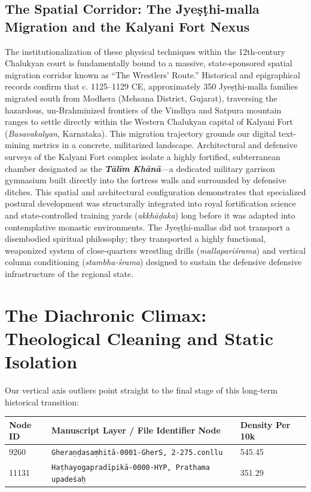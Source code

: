 \documentclass[11pt,letterpaper]{article}
\begin{document}
\subsection{The Spatial Corridor: The Jyeṣṭhi-malla Migration and the Kalyani Fort Nexus}
The institutionalization of these physical techniques within the 12th-century Chalukyan court is fundamentally bound to a massive, state-sponsored spatial migration corridor known as ``The Wrestlers’ Route.'' Historical and epigraphical records confirm that c. 1125--1129 CE, approximately 350 Jyeṣṭhi-malla families migrated south from Modhera (Mehsana District, Gujarat), traversing the hazardous, un-Brahminized frontiers of the Vindhya and Satpura mountain ranges to settle directly within the Western Chalukyan capital of Kalyani Fort (\textit{Basavakalyan}, Karnataka). This migration trajectory grounds our digital text-mining metrics in a concrete, militarized landscape. Architectural and defensive surveys of the Kalyani Fort complex isolate a highly fortified, subterranean chamber designated as the \textbf{\textit{Tālīm Khānā}}---a dedicated military garrison gymnasium built directly into the fortress walls and surrounded by defensive ditches. This spatial and architectural configuration demonstrates that specialized postural development was structurally integrated into royal fortification science and state-controlled training yards (\textit{akkhāḍaka}) long before it was adapted into contemplative monastic environments. The Jyeṣṭhi-mallas did not transport a disembodied spiritual philosophy; they transported a highly functional, weaponized system of close-quarters wrestling drills (\textit{mallapariśrama}) and vertical column conditioning (\textit{stambha-śrama}) designed to sustain the defensive defensive infrastructure of the regional state.


\section{The Diachronic Climax: Theological Cleaning and Static Isolation}
Our vertical axis outliers point straight to the final stage of this long-term historical transition:

\begin{table}[h!]
\centering
\footnotesize
\begin{tabular}{lll}
\toprule
\textbf{Node ID} & \textbf{Manuscript Layer / File Identifier Node} & \textbf{Density Per 10k} \\
\midrule
9260 & \texttt{Gheraṇḍasaṃhitā-0001-GherS, 2-275.conllu} & 545.45 \\
11131 & \texttt{Haṭhayogapradīpikā-0000-HYP, Prathama upadeśaḥ} & 351.29 \\
\bottomrule
\end{tabular}
\end{table}
\end{document}
